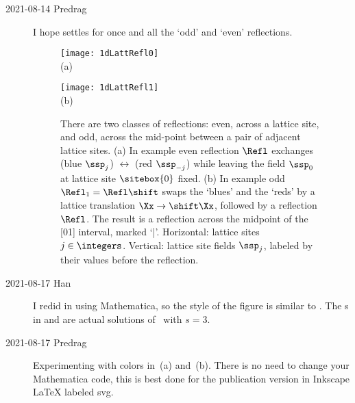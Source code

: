 \begin{description}
\item[2021-08-14 Predrag]
I hope  settles for once and all the `odd' and
`even' reflections.

\begin{figure} \begin{center}
  \begin{minipage}[b]{0.40\textwidth}\begin{center}
\texttt{[image: 1dLattRefl0]}
  \\ (a)
  \end{center}\end{minipage}
\qquad
  \begin{minipage}[b]{0.40\textwidth}\begin{center}
\texttt{[image: 1dLattRefl1]}
  \\ (b)
  \end{center} \end{minipage}
  \end{center}
  \caption{\label{fig:1dLattRefl}
There are two classes  of {\lattstate} reflections:
even, across a lattice site, and odd, across the mid-point between
a pair of adjacent lattice sites.
    (a)
In example  even reflection $\Refl$ exchanges (blue
$\ssp_j$) $\leftrightarrow$  (red $\ssp_{-j}$) %
while leaving the
field $\ssp_0$ at lattice site $\sitebox{0}$ fixed.
    (b)
In example  odd $\Refl_1=\Refl\shift$ swaps the
`blues' and the `reds' by a lattice
translation $\Xx\to\shift\Xx$, followed by a reflection $\Refl$. The
result is a reflection across the midpoint of the [01] interval,  marked
`|'.
Horizontal: lattice sites $j\in\integers$. Vertical: lattice site
fields $\ssp_j$, labeled by their values before the reflection.
}
\end{figure}

\item[2021-08-17 Han]
I redid  in  using Mathematica,
 so the style of the figure is similar
to .
The {\lattstate}s in  and 
are actual solutions of \templatt\ with $s=3$.

\item[2021-08-17 Predrag]
Experimenting with colors in \,(a) and
\,(b). There is no need to change your
Mathematica code, this is best done for the publication version in
Inkscape LaTeX labeled svg.


\end{description}
